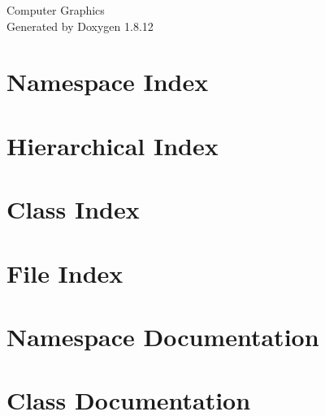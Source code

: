 \documentclass[twoside]{book}
\newcommand{\+}{\discretionary{\mbox{\scriptsize$\hookleftarrow$}}{}{}}
\newcommand{\clearemptydoublepage}{%
  \newpage{\pagestyle{empty}\cleardoublepage}%
}
\begin{document}
\hypersetup{pageanchor=false,
             bookmarksnumbered=true,
             pdfencoding=unicode
            }
\begin{titlepage}
\vspace*{7cm}
\begin{center}%
{\Large Computer Graphics }\\
\vspace*{1cm}
{\large Generated by Doxygen 1.8.12}\\
\end{center}
\end{titlepage}
\clearemptydoublepage
{}
\tableofcontents
\clearemptydoublepage
{}
\hypersetup{pageanchor=true}

\chapter{Namespace Index}

\chapter{Hierarchical Index}

\chapter{Class Index}

\chapter{File Index}

\chapter{Namespace Documentation}


\chapter{Class Documentation}

























\end{document}
